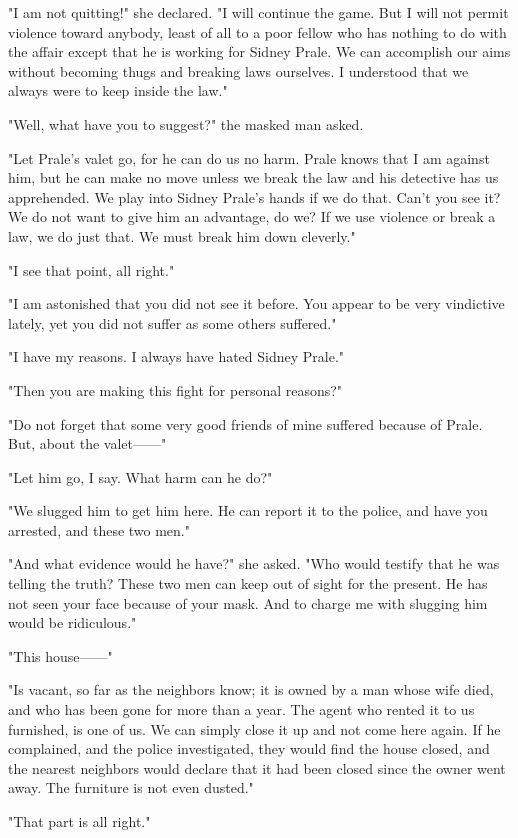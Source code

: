 \documentclass{novel}
\begin{document}
"I am not quitting!" she declared. "I will continue the game. But I will not permit violence toward anybody, least of all to a poor fellow who has nothing to do with the affair except that he is working for Sidney Prale. We can accomplish our aims without becoming thugs and breaking laws ourselves. I understood that we always were to keep inside the law."

"Well, what have you to suggest?" the masked man asked.

"Let Prale's valet go, for he can do us no harm. Prale knows that I am against him, but he can make no move unless we break the law and his detective has us apprehended. We play into Sidney Prale's hands if we do that. Can't you see it? We do not want to give him an advantage, do we? If we use violence or break a law, we do just that. We must break him down cleverly."

"I see that point, all right."

"I am astonished that you did not see it before. You appear to be very vindictive lately, yet you did not suffer as some others suffered."

"I have my reasons. I always have hated Sidney Prale."

"Then you are making this fight for personal reasons?"

"Do not forget that some very good friends of mine suffered because of Prale. But, about the valet------"

"Let him go, I say. What harm can he do?"

"We slugged him to get him here. He can report it to the police, and have you arrested, and these two men."

"And what evidence would he have?" she asked. "Who would testify that he was telling the truth? These two men can keep out of sight for the present. He has not seen your face because of your mask. And to charge me with slugging him would be ridiculous."

"This house------"

"Is vacant, so far as the neighbors know; it is owned by a man whose wife died, and who has been gone for more than a year. The agent who rented it to us furnished, is one of us. We can simply close it up and not come here again. If he complained, and the police investigated, they would find the house closed, and the nearest neighbors would declare that it had been closed since the owner went away. The furniture is not even dusted."

"That part is all right."
\end{document}
